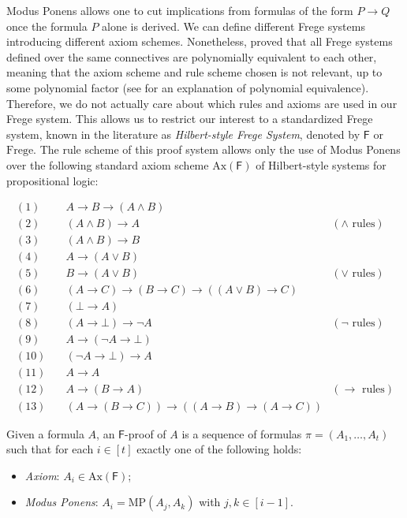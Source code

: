 Modus Ponens allows one to cut implications from formulas of the form $P \to Q$ once the formula $P$ alone is derived. We can define different Frege systems introducing different axiom schemes. Nonetheless, \textcite{reckhow} proved that all Frege systems defined over the same connectives are polynomially equivalent to each other, meaning that the axiom scheme and rule scheme chosen is not relevant, up to some polynomial factor (see  for an explanation of polynomial equivalence). Therefore, we do not actually care about which rules and axioms are used in our Frege system. This allows us to restrict our interest to a standardized Frege system, known in the literature as \textit{Hilbert-style Frege System}, denoted by $\mathsf{F}$ or $\mathrm{Frege}$. The rule scheme of this proof system allows only the use of Modus Ponens over the following standard axiom scheme $\mathrm{Ax}(\mathsf{F})$ of Hilbert-style systems for propositional logic:

\[\begin{array}{clr}
    (1) \quad & A \to B \to (A \land B) \\
    (2) \quad & (A \land B) \to A & (\land \text{ rules}) \\
    (3) \quad & (A \land B) \to B \\[1em]
    (4) \quad & A \to (A \lor B) \\
    (5) \quad & B \to (A \lor B) & (\lor \text{ rules}) \\
    (6) \quad & (A \to C) \to (B \to C) \to ((A \lor B) \to C) \\[1em]
    (7) \quad & (\bot \to A) \\
    (8) \quad & (A \to \bot) \to \neg A & (\neg \text{ rules}) \\
    (9) \quad & A \to (\neg A \to \bot) \\
    (10) \quad & (\neg A \to \bot) \to A \\[1em]
    (11) \quad & A \to A \\
    (12) \quad & A \to (B \to A) & (\to \text{ rules}) \\
    (13) \quad & (A \to (B \to C)) \to ((A \to B) \to (A \to C))
\end{array}\]

Given a formula $A$, an $\mathsf{F}$-proof of $A$ is a sequence of formulas $\pi = (A_1, \ldots , A_t)$ such that for each $i \in [t]$ exactly one of the following holds:
\begin{itemize}
    \item \textit{Axiom}: $A_i \in \mathrm{Ax}(\mathsf{F})$;
    \item \textit{Modus Ponens}: $A_i = \mathrm{MP}(A_j, A_k)$ with $j,k \in [i-1]$.
\end{itemize}

